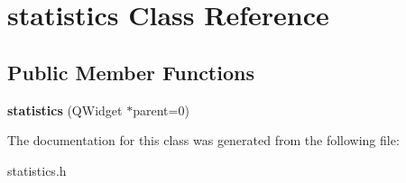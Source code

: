 \hypertarget{classstatistics}{
\section{statistics Class Reference}
\label{classstatistics}
}
\subsection*{Public Member Functions}
\begin{DoxyCompactItemize}
\item 
\hypertarget{classstatistics_a2dc9a77ff9eb30c4f1e7f80d110807fe}{
{\bfseries statistics} (QWidget $\ast$parent=0)}
\label{classstatistics_a2dc9a77ff9eb30c4f1e7f80d110807fe}

\end{DoxyCompactItemize}


The documentation for this class was generated from the following file:\begin{DoxyCompactItemize}
\item 
statistics.h\end{DoxyCompactItemize}
